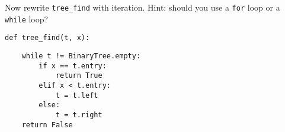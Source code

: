 \question Now rewrite \texttt{tree\_find} with iteration. Hint: should you use a \texttt{for} loop or a \texttt{while} loop?

\begin{lstlisting}
def tree_find(t, x):
\end{lstlisting}
\begin{solution}[2.5in]
\begin{lstlisting}
    while t != BinaryTree.empty:
        if x == t.entry:
            return True
        elif x < t.entry:
            t = t.left
        else:
            t = t.right
    return False
\end{lstlisting}
\end{solution}
